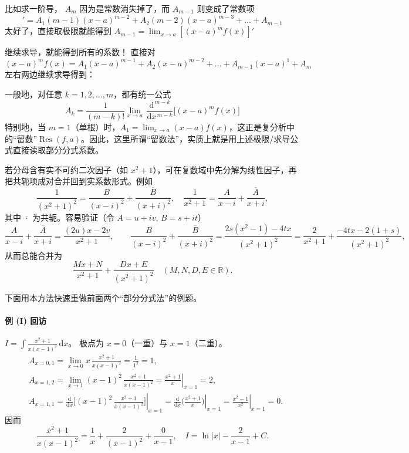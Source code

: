 \documentclass[lang=cn,newtx,10pt,scheme=chinese]{elegantbook}
\begin{document}
    比如求一阶导， $A_m$ 因为是常数消失掉了，而 $A_{m-1}$ 则变成了常数项
\begin{equation}
  [(x-a)^{m}f(x)]'=A_1 (m-1)(x - a)^{m-2} + A_2 (m-2)(x - a)^{m-3} + \dots + A_{m-1}
\end{equation}
 太好了，直接取极限就能得到 $A_{m-1}=\lim_{x \to a} [(x-a)^{m}f(x)]'$

 继续求导，就能得到所有的系数！
 直接对 $(x-a)^{m}f(x)=A_1 (x - a)^{m-1} + A_2 (x - a)^{m-2} + \dots + A_{m-1} (x - a)^{1} + A_m$ 左右两边继续求导得到：

  一般地，对任意 $k=1,2,\dots,m$，都有统一公式
  \begin{equation}
    \boxed{\;A_k=\frac{1}{(m-k)!}\lim_{x\to a}\,\frac{\mathrm{d}^{\,m-k}}{\mathrm{d}x^{\,m-k}}\Big[(x-a)^{m}f(x)\Big]\;}
  \end{equation}
  特别地，当 $m=1$（单根）时，$A_1=\displaystyle\lim_{x\to a}(x-a)f(x)$，这正是复分析中的“留数”$\operatorname{Res}(f,a)$。因此，这里所谓“留数法”，实质上就是用上述极限/求导公式直接读取部分分式系数。

  若分母含有实不可约二次因子（如 $x^2+1$），可在复数域中先分解为线性因子，再把共轭项成对合并回到实系数形式。例如
  \begin{equation}
    \frac{1}{(x^2+1)^2}=\frac{B}{(x-i)^2}+\frac{\overline{B}}{(x+i)^2},\quad
    \frac{1}{x^2+1}=\frac{A}{x-i}+\frac{\overline{A}}{x+i},
  \end{equation}
  其中 $\overline{\cdot}$ 为共轭。容易验证（令 $A=u+iv,\,B=s+it$）
  \begin{equation}
    \frac{A}{x-i}+\frac{\overline{A}}{x+i}=\frac{(2u)x-2v}{x^2+1},\qquad
    \frac{B}{(x-i)^2}+\frac{\overline{B}}{(x+i)^2}=\frac{2s(x^2-1)-4t x}{(x^2+1)^2}
    =\frac{2}{x^2+1}+\frac{-4t x-2(1+s)}{(x^2+1)^2},
  \end{equation}
  从而总能合并为
  \begin{equation}
    \frac{Mx+N}{x^2+1}+\frac{Dx+E}{(x^2+1)^2}\quad (M,N,D,E\in\mathbb{R}).
  \end{equation}

  下面用本方法快速重做前面两个“部分分式法”的例题。

  \paragraph{例 (I) 回访} $\displaystyle I=\int \frac{x^2+1}{x(x-1)^2}\,\mathrm{d}x$。
  极点为 $x=0$（一重）与 $x=1$（二重）。
  \begin{align*}
    &A_{x=0,1}=\lim_{x\to 0} x\,\frac{x^2+1}{x(x-1)^2}=\frac{1}{1^2}=1,\\
    &A_{x=1,2}=\lim_{x\to 1}(x-1)^2\,\frac{x^2+1}{x(x-1)^2}=\left.\frac{x^2+1}{x}\right|_{x=1}=2,\\
    &A_{x=1,1}=\left.\frac{\mathrm{d}}{\mathrm{d}x}\Big[(x-1)^2\,\frac{x^2+1}{x(x-1)^2}\Big]\right|_{x=1}
    =\left.\frac{\mathrm{d}}{\mathrm{d}x}\Big(\frac{x^2+1}{x}\Big)\right|_{x=1}=\left.\frac{x^2-1}{x^2}\right|_{x=1}=0.
  \end{align*}
  因而
  \begin{equation*}
    \frac{x^2+1}{x(x-1)^2}=\frac{1}{x}+\frac{2}{(x-1)^2}+\frac{0}{x-1},\quad
    I=\ln|x|-\frac{2}{x-1}+C.
  \end{equation*}
\end{document}
